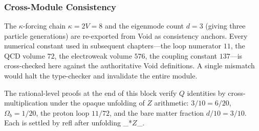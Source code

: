 \documentclass[11pt,a4paper]{book}
\def\mathbb#1{#1}%
\def\texttt#1{#1}%
\begin{document}
\begin{code}
\>[0][@{}l@{\AgdaIndent{0}}]%
\>[2]\AgdaSymbol{\{}\AgdaSpace{}%
\AgdaSpace{}%
\AgdaSymbol{=}\AgdaSpace{}%
\<%
\\
%
\>[2]\AgdaSymbol{;}\AgdaSpace{}%
\AgdaSpace{}%
\AgdaSymbol{=}\AgdaSpace{}%
\<%
\\
%
\>[2]\AgdaSymbol{;}\AgdaSpace{}%
\AgdaSpace{}%
\AgdaSymbol{=}\AgdaSpace{}%
\<%
\\
%
\>[2]\AgdaSymbol{;}\AgdaSpace{}%
\AgdaSpace{}%
\AgdaSymbol{=}\AgdaSpace{}%
\AgdaSpace{}%
\AgdaSymbol{(}\AgdaSpace{}%
\AgdaSymbol{(}\AgdaSpace{}%
\AgdaSymbol{(}\AgdaSpace{}%
\AgdaSymbol{)))}\AgdaSpace{}%
\AgdaSymbol{\}}\<%
\end{code}

\subsubsection*{Cross-Module Consistency}

The $\kappa$-forcing chain $\kappa = 2V = 8$ and the eigenmode count
$d = 3$ (giving three particle generations) are re-exported from Void
as consistency anchors.  Every numerical constant used in subsequent
chapters---the loop numerator $11$, the QCD volume $72$, the electroweak
volume $576$, the coupling constant $137$---is cross-checked here against
the authoritative Void definitions.  A single mismatch would halt the
type-checker and invalidate the entire module.

The rational-level proofs at the end of this block verify $\mathbb{Q}$
identities by cross-multiplication under the opaque unfolding of
$\mathbb{Z}$ arithmetic: $3/10 = 6/20$, $\Omega_b = 1/20$,
the proton loop $11/72$, and the bare matter fraction $d/10 = 3/10$.
Each is settled by \texttt{refl} after unfolding \texttt{\_*$\mathbb{Z}$\_}.
\end{document}
